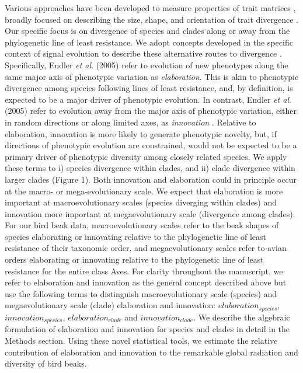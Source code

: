 \documentclass[12pt,letterpaper]{article}
\begin{document}
Various approaches have been developed to measure properties of trait matrices \cite{hansen2008measuring, pavlicev2009measuring, watanabe2022}, broadly focused on describing the size, shape, and orientation of trait divergence \cite{phillips1999}.
Our specific focus is on divergence of species and clades along or away from the phylogenetic line of least resistance.
We adopt concepts developed in the specific context of signal evolution to describe these alternative routes to divergence \cite{endler2005animal}.
Specifically, Endler \textit{et al}. (2005) refer to evolution of new phenotypes along the same major axis of phenotypic variation as \textit{elaboration}.
This is akin to phenotypic divergence among species following lines of least resistance, and, by definition, is expected to be a major driver of phenotypic evolution.
In contrast, Endler \textit{et al}. (2005) refer to evolution away from the major axis of phenotypic variation, either in random directions or along limited axes, as \textit{innovation} \cite{endler2005animal}.
Relative to elaboration, innovation is more likely to generate phenotypic novelty, but, if directions of phenotypic evolution are constrained, would not be expected to be a primary driver of phenotypic diversity among closely related species.
We apply these terms to i) species divergence within clades, and ii) clade divergence within larger clades (Figure 1).
Both innovation and elaboration could in principle occur at the macro- or mega-evolutionary scale.
We expect that elaboration is more important at macroevolutionary scales (species diverging within clades) and innovation more important at megaevolutionary scale (divergence among clades).
For our bird beak data, macroevolutionary scales refer to the beak shapes of species elaborating or innovating relative to the phylogenetic line of least resistance of their taxonomic order, and megaevolutionary scales refer to avian orders elaborating or innovating relative to the phylogenetic line of least resistance for the entire class Aves.
For clarity throughout the manuscript, we refer to elaboration and innovation as the general concept described above but use the following terms to distinguish macroevolutionary scale (species) and megaevolutionary scale (clade) elaboration and innovation: $elaboration_{species}$, $innovation_{species}$, $elaboration_{clade}$ and $innovation_{clade}$.
We describe the algebraic formulation of elaboration and innovation for species and clades in detail in the Methods section.
Using these novel statistical tools, we estimate the relative contribution of elaboration and innovation to the remarkable global radiation and diversity of bird beaks.
\end{document}
